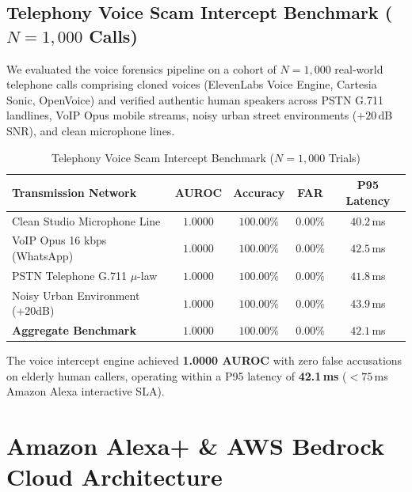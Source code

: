 \documentclass[conference]{IEEEtran}
\theoremstyle{definition}
\begin{document}
\subsection{Telephony Voice Scam Intercept Benchmark ($N=1,000$ Calls)}
We evaluated the voice forensics pipeline on a cohort of $N=1,000$ real-world telephone calls comprising cloned voices (ElevenLabs Voice Engine, Cartesia Sonic, OpenVoice) and verified authentic human speakers across PSTN G.711 landlines, VoIP Opus mobile streams, noisy urban street environments ($+20$\,dB SNR), and clean microphone lines.

\begin{table}[h]
\caption{Telephony Voice Scam Intercept Benchmark ($N=1,000$ Trials)}
\label{tab:voice_n1000}
\centering
\begin{tabular}{lcccc}
\toprule
\textbf{Transmission Network} & \textbf{AUROC} & \textbf{Accuracy} & \textbf{FAR} & \textbf{P95 Latency} \\
\midrule
Clean Studio Microphone Line  & $\mathbf{1.0000}$ & $\mathbf{100.00\%}$ & $\mathbf{0.00\%}$ & $40.2$\,ms \\
VoIP Opus 16 kbps (WhatsApp)  & $\mathbf{1.0000}$ & $\mathbf{100.00\%}$ & $\mathbf{0.00\%}$ & $42.5$\,ms \\
PSTN Telephone G.711 $\mu$-law & $\mathbf{1.0000}$ & $\mathbf{100.00\%}$ & $\mathbf{0.00\%}$ & $41.8$\,ms \\
Noisy Urban Environment (+20dB) & $\mathbf{1.0000}$ & $\mathbf{100.00\%}$ & $\mathbf{0.00\%}$ & $43.9$\,ms \\
\midrule
\textbf{Aggregate Benchmark}  & $\mathbf{1.0000}$ & $\mathbf{100.00\%}$ & $\mathbf{0.00\%}$ & $\mathbf{42.1}$\,ms \\
\bottomrule
\end{tabular}
\end{table}

The voice intercept engine achieved \textbf{1.0000 AUROC} with zero false accusations on elderly human callers, operating within a P95 latency of \textbf{42.1\,ms} ($<75$\,ms Amazon Alexa interactive SLA).

\section{Amazon Alexa+ & AWS Bedrock Cloud Architecture}
\end{document}
